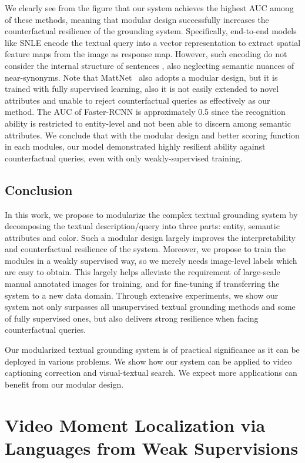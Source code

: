 We clearly see from the figure that our system achieves the highest AUC among of these methods, meaning that modular design successfully increases the counterfactual resilience of the grounding system. Specifically, end-to-end models like SNLE \citep{hu2016segmentation} encode the textual query
into a vector representation to extract spatial feature maps from the image as response map. However, such encoding do not consider the internal structure of sentences \citep{macwhinney1997second}, also neglecting semantic nuances of near-synonyms. Note that MattNet~\citep{yu2018mattnet} also adopts a modular design, but it is trained with fully supervised learning, also it is not easily extended to novel attributes and unable to reject counterfactual queries as effectively as our method.
The AUC of Faster-RCNN is approximately 0.5 since the recognition ability is restricted to entity-level and not been able to discern among semantic attributes.
We conclude that with the modular design and better scoring function in each modules, our model demonstrated highly resilient ability against counterfactual queries, even with only weakly-supervised training.


\subsection{Conclusion}
In this work, we propose to modularize the complex textual grounding system
by decomposing the textual description/query into three parts:
entity, semantic attributes and color.
Such a modular design largely improves the interpretability and counterfactual resilience of the system.
Moreover,
we propose to train the modules in a weakly supervised way,
so we merely needs image-level labels which are easy to obtain.
This largely helps alleviate the requirement of large-scale manual annotated images for training,
and for fine-tuning if transferring the system to a new data domain.
Through extensive experiments,
we show our system not only surpasses all unsupervised textual grounding methods
and some of fully supervised ones,
but also delivers strong resilience when facing counterfactual queries.

Our modularized textual grounding system is of practical significance as it can be deployed
in various problems.
We show how our system can be applied to video captioning correction and visual-textual search.
We expect more applications can benefit from our modular design.


\section{Video Moment Localization via Languages from Weak Supervisions}

